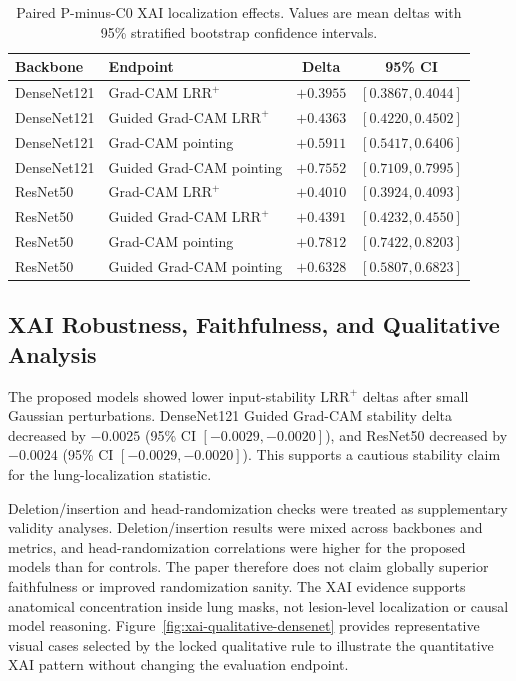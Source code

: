 \documentclass[runningheads]{llncs}
\newcommand{\lrrpos}{\mathrm{LRR}^{+}}
\begin{document}
\begin{table}[htbp]
\centering
\caption{Paired P-minus-C0 XAI localization effects. Values are mean deltas with
95\% stratified bootstrap confidence intervals.}
\label{tab:xai-deltas}
{\setlength{\tabcolsep}{5pt}
\begin{tabular}{llcc}
\toprule
Backbone & Endpoint & Delta & 95\% CI \\
\midrule
DenseNet121 & Grad-CAM $\lrrpos$ & $+0.3955$ & $[0.3867,0.4044]$ \\
DenseNet121 & Guided Grad-CAM $\lrrpos$ & $+0.4363$ & $[0.4220,0.4502]$ \\
DenseNet121 & Grad-CAM pointing & $+0.5911$ & $[0.5417,0.6406]$ \\
DenseNet121 & Guided Grad-CAM pointing & $+0.7552$ & $[0.7109,0.7995]$ \\
ResNet50 & Grad-CAM $\lrrpos$ & $+0.4010$ & $[0.3924,0.4093]$ \\
ResNet50 & Guided Grad-CAM $\lrrpos$ & $+0.4391$ & $[0.4232,0.4550]$ \\
ResNet50 & Grad-CAM pointing & $+0.7812$ & $[0.7422,0.8203]$ \\
ResNet50 & Guided Grad-CAM pointing & $+0.6328$ & $[0.5807,0.6823]$ \\
\bottomrule
\end{tabular}}
\end{table}

\subsection{XAI Robustness, Faithfulness, and Qualitative Analysis}

The proposed models showed lower input-stability $\lrrpos$ deltas after small
Gaussian perturbations. DenseNet121 Guided Grad-CAM stability delta decreased by
$-0.0025$ (95\% CI $[-0.0029,-0.0020]$), and ResNet50 decreased by $-0.0024$
(95\% CI $[-0.0029,-0.0020]$). This supports a cautious stability claim for the
lung-localization statistic.

Deletion/insertion and head-randomization checks were treated as supplementary
validity analyses. Deletion/insertion results were mixed across backbones and
metrics, and head-randomization correlations were higher for the proposed models
than for controls. The paper therefore does not claim globally superior
faithfulness or improved randomization sanity. The XAI evidence supports
anatomical concentration inside lung masks, not lesion-level localization or
causal model reasoning.
Figure~\ref{fig:xai-qualitative-densenet} provides representative visual cases
selected by the locked qualitative rule to illustrate the quantitative XAI
pattern without changing the evaluation endpoint.
\end{document}
